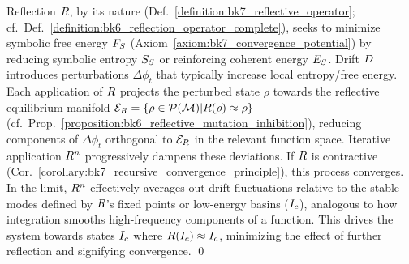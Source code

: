 \begin{demonstratio}
\label{demonstratio:bk7_reflective_averaging_free_energy}
Reflection \(R\), by its nature (Def.~\ref{definition:bk7_reflective_operator}; cf.~Def.~\ref{definition:bk6_reflection_operator_complete}), seeks to minimize symbolic free energy \(F_S\) (Axiom~\ref{axiom:bk7_convergence_potential}) by reducing symbolic entropy \(S_S\) or reinforcing coherent energy \(E_S\). Drift \(D\) introduces perturbations \(\Delta \phi_t\) that typically increase local entropy/free energy. Each application of \(R\) projects the perturbed state \(\rho\) towards the reflective equilibrium manifold \(\mathcal{E}_R = \{\rho \in \mathcal{P}(\mathcal{M}) | R(\rho) \approx \rho \}\) (cf.~Prop.~\ref{proposition:bk6_reflective_mutation_inhibition}), reducing components of \(\Delta \phi_t\) orthogonal to \(\mathcal{E}_R\) in the relevant function space. Iterative application \(R^n\) progressively dampens these deviations. If \(R\) is contractive (Cor.~\ref{corollary:bk7_recursive_convergence_principle}), this process converges. In the limit, \(R^n\) effectively averages out drift fluctuations relative to the stable modes defined by \(R\)'s fixed points or low-energy basins (\(I_c\)), analogous to how integration smooths high-frequency components of a function. This drives the system towards states \(I_c\) where \(R(I_c) \approx I_c\), minimizing the effect of further reflection and signifying convergence. \qed
\end{demonstratio}
